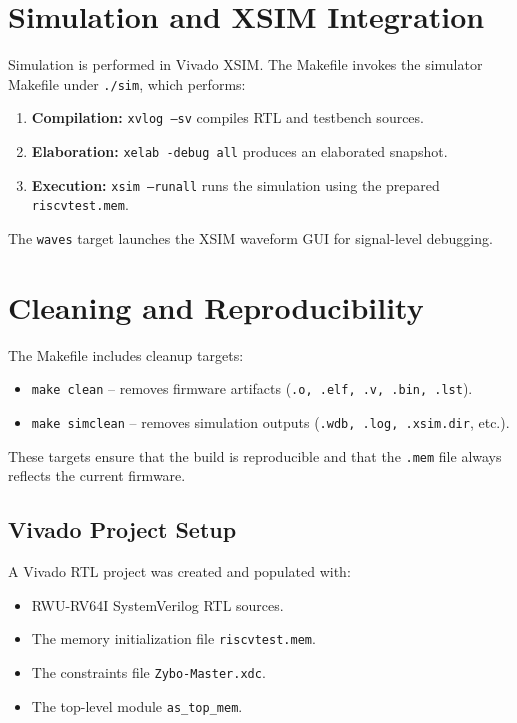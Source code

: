 \section{Simulation and XSIM Integration}
Simulation is performed in Vivado XSIM. The Makefile invokes the simulator Makefile under \texttt{./sim}, which performs:
\begin{enumerate}
  \item \textbf{Compilation:} \texttt{xvlog --sv} compiles RTL and testbench sources.
  \item \textbf{Elaboration:} \texttt{xelab -debug all} produces an elaborated snapshot.
  \item \textbf{Execution:} \texttt{xsim --runall} runs the simulation using the prepared \texttt{riscvtest.mem}.
\end{enumerate}

The \texttt{waves} target launches the XSIM waveform GUI for signal-level debugging.

\section{Cleaning and Reproducibility}
The Makefile includes cleanup targets:

\begin{itemize}
  \item \texttt{make clean} – removes firmware artifacts (\texttt{.o, .elf, .v, .bin, .lst}).
  \item \texttt{make simclean} – removes simulation outputs (\texttt{.wdb, .log, .xsim.dir}, etc.).
\end{itemize}

These targets ensure that the build is reproducible and that the \texttt{.mem} file always reflects the current firmware.

\subsection{Vivado Project Setup}
A Vivado RTL project was created and populated with:
\begin{itemize}
  \item RWU-RV64I SystemVerilog RTL sources.
  \item The memory initialization file \texttt{riscvtest.mem}.
  \item The constraints file \texttt{Zybo-Master.xdc}.
  \item The top-level module \texttt{as\_top\_mem}.
\end{itemize}

